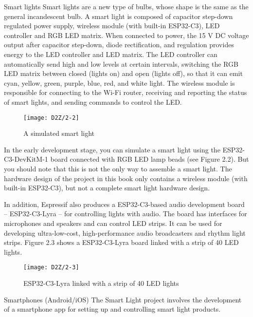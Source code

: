 \documentclass[a4paper,12pt]{book}
\begin{document}
\begin{term}{Smart lights}
    Smart lights are a new type of bulbs, whose shape is the same as the general incandescent bulb. A smart light is composed of capacitor step-down regulated power supply, wireless module (with built-in ESP32-C3), LED controller and RGB LED matrix. When connected to power, the 15 V DC voltage output after capacitor step-down, diode rectification, and regulation provides energy to the LED controller and LED matrix. The LED controller can automatically send high and low levels at certain intervals, switching the RGB LED matrix between closed (lights on) and open (lights off), so that it can emit cyan, yellow, green, purple, blue, red, and white light. The wireless module is responsible for connecting to the Wi-Fi router, receiving and reporting the status of smart lights, and sending commands to control the LED.

    \begin{figure}[!ht]
        \centering
        \texttt{[image: D2Z/2-2]}
        \caption{A simulated smart light}
    \end{figure}

    In the early development stage, you can simulate a smart light using the ESP32-C3-DevKitM-1 board connected with RGB LED lamp beads (see Figure 2.2). But you should note that this is not the only way to assemble a smart light. The hardware design of the project in this book only contains a wireless module (with built-in ESP32-C3), but not a complete smart light hardware design.

    \parskip 6pt
    In addition, Espressif also produces a ESP32-C3-based audio development board – ESP32-C3-Lyra – for controlling lights with audio. The board has interfaces for microphones and speakers and can control LED strips. It can be used for developing ultra-low-cost, high-performance audio broadcasters and rhythm light strips. Figure 2.3 shows a ESP32-C3-Lyra board linked with a strip of 40 LED lights.

    \begin{figure}[!ht]
        \centering
        \texttt{[image: D2Z/2-3]}
        \caption{ESP32-C3-Lyra linked with a strip of 40 LED lights}
    \end{figure}
\end{term}

\begin{term}{Smartphones (Android/iOS)}
    The Smart Light project involves the development of a smartphone app for setting up and controlling smart light products.
\end{term}
\end{document}
